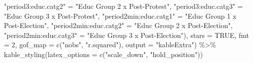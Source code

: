 \documentclass[
  letterpaper,
  DIV=11,
  numbers=noendperiod]{scrartcl}
\newenvironment{Shaded}{\begin{snugshade}}{\end{snugshade}}
\newcommand{\AttributeTok}[1]{\textcolor[rgb]{0.40,0.45,0.13}{#1}}
\newcommand{\ConstantTok}[1]{\textcolor[rgb]{0.56,0.35,0.01}{#1}}
\newcommand{\DecValTok}[1]{\textcolor[rgb]{0.68,0.00,0.00}{#1}}
\newcommand{\FunctionTok}[1]{\textcolor[rgb]{0.28,0.35,0.67}{#1}}
\newcommand{\NormalTok}[1]{\textcolor[rgb]{0.00,0.23,0.31}{#1}}
\newcommand{\OtherTok}[1]{\textcolor[rgb]{0.00,0.23,0.31}{#1}}
\newcommand{\SpecialCharTok}[1]{\textcolor[rgb]{0.37,0.37,0.37}{#1}}
\newcommand{\StringTok}[1]{\textcolor[rgb]{0.13,0.47,0.30}{#1}}
\begin{document}
\begin{Shaded}
\begin{Highlighting}[]
                          \StringTok{"period3:educ.catg2"} \OtherTok{=} \StringTok{"Educ Group 2 x Post{-}Protest"}\NormalTok{,}
                          \StringTok{"period3:educ.catg3"} \OtherTok{=} \StringTok{"Educ Group 3 x Post{-}Protest"}\NormalTok{,}
                          \StringTok{"period2min:educ.catg1"} \OtherTok{=} \StringTok{"Educ Group 1 x Post{-}Election"}\NormalTok{,}
                          \StringTok{"period2min:educ.catg2"} \OtherTok{=} \StringTok{"Educ Group 2 x Post{-}Election"}\NormalTok{,}
                          \StringTok{"period2min:educ.catg3"} \OtherTok{=} \StringTok{"Educ Group 3 x Post{-}Election"}\NormalTok{),}
             \AttributeTok{stars =} \ConstantTok{TRUE}\NormalTok{, }\AttributeTok{fmt =} \DecValTok{2}\NormalTok{, }\AttributeTok{gof\_map =} \FunctionTok{c}\NormalTok{(}\StringTok{"nobs"}\NormalTok{, }\StringTok{"r.squared"}\NormalTok{),}
             \AttributeTok{output =} \StringTok{"kableExtra"}\NormalTok{) }\SpecialCharTok{\%\textgreater{}\%} 
   \FunctionTok{kable\_styling}\NormalTok{(}\AttributeTok{latex\_options =} \FunctionTok{c}\NormalTok{(}\StringTok{"scale\_down"}\NormalTok{, }\StringTok{"hold\_position"}\NormalTok{))}
\end{Highlighting}
\end{Shaded}
\end{document}
